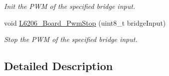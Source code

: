 \begin{DoxyCompactItemize}
\begin{DoxyCompactList}\small\item\em Init the P\+WM of the specified bridge input. \end{DoxyCompactList}\item 
\mbox{\label{group___motor_control___board___linked___functions_ga72581c091a2ff2d49caf2a3268a429fe}} 
void \mbox{\hyperlink{group___motor_control___board___linked___functions_ga72581c091a2ff2d49caf2a3268a429fe}{L6206\+\_\+\+Board\+\_\+\+Pwm\+Stop}} (uint8\+\_\+t bridge\+Input)
\begin{DoxyCompactList}\small\item\em Stop the P\+WM of the specified bridge input. \end{DoxyCompactList}\end{DoxyCompactItemize}


\subsection{Detailed Description}
